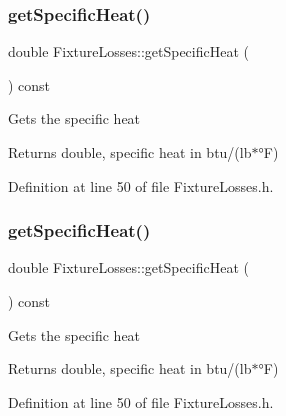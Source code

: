 \mbox{\label{class_fixture_losses_adb3ea84a757bac31c52784cdd15349ea}} 
\subsubsection{\texorpdfstring{get\+Specific\+Heat()}{getSpecificHeat()}\hspace{0.1cm}{\footnotesize\ttfamily [1/3]}}
{\footnotesize\ttfamily double Fixture\+Losses\+::get\+Specific\+Heat (\begin{DoxyParamCaption}{ }\end{DoxyParamCaption}) const\hspace{0.3cm}{\ttfamily [inline]}}

Gets the specific heat \begin{DoxyReturn}{Returns}
double, specific heat in btu/(lb$\ast$°F) 
\end{DoxyReturn}


Definition at line 50 of file Fixture\+Losses.\+h.

\mbox{\label{class_fixture_losses_adb3ea84a757bac31c52784cdd15349ea}} 
\subsubsection{\texorpdfstring{get\+Specific\+Heat()}{getSpecificHeat()}\hspace{0.1cm}{\footnotesize\ttfamily [2/3]}}
{\footnotesize\ttfamily double Fixture\+Losses\+::get\+Specific\+Heat (\begin{DoxyParamCaption}{ }\end{DoxyParamCaption}) const\hspace{0.3cm}{\ttfamily [inline]}}

Gets the specific heat \begin{DoxyReturn}{Returns}
double, specific heat in btu/(lb$\ast$°F) 
\end{DoxyReturn}


Definition at line 50 of file Fixture\+Losses.\+h.

\mbox{\label{class_fixture_losses_adb3ea84a757bac31c52784cdd15349ea}} 
